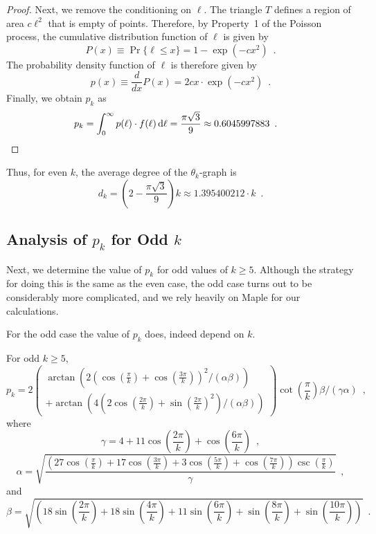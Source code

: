 \documentclass{patmorin}
\begin{document}
\begin{proof}
  Next, we remove the conditioning on $\ell$.  The triangle $T$ defines a
  region of area $c\ell^2$ that is empty of points.  Therefore,
  by Property~1 of the Poisson process, the cumulative distribution
  function of $\ell$ is given by
  \[
    P(x) \equiv \Pr\{\ell \le x\} = 1-\exp(-cx^2) \enspace .
  \]
  The probability density function of $\ell$ is therefore given by 
  \[
     p(x) \equiv \frac{d}{dx}P(x) =
     2cx\cdot\exp(-cx^2) \enspace .
  \]
  Finally, we obtain $p_k$ as 
  \begin{align*}
     p_k = \int_0^\infty p(\ell)\cdot f(\ell)\,\mathrm{d}\ell 
     = \frac{\pi\sqrt{3}}{9}
      \approx 0.6045997883  \enspace . & \qedhere
  \end{align*}
\end{proof}

Thus, for even $k$, the average degree of the $\theta_k$-graph is 
\[ d_k = \left(2-\frac{\pi\sqrt{3}}{9}\right)k \approx 1.395400212\cdot k \enspace . \]

\subsection{Analysis of $p_k$ for Odd $k$}

Next, we determine the value of $p_k$ for odd values of
$k\ge 5$.  Although the strategy for doing this is the same as the even
case, the odd case turns out to be considerably more complicated, and
we rely heavily on Maple for our calculations.

For the odd case the value of $p_k$ does, indeed depend on $k$.

\begin{lem}
  For odd $k\ge 5$,
\[
p_k = 
2
\left(\begin{array}{l}
  \arctan\left(
     2\left(\cos\left(\frac{\pi }{k}\right)
       +\cos\left(\frac{3 \pi }{k}\right)\right)^2 / (\alpha\beta) 
  \right) \\
   + \arctan\left(
       4 \left(2 \cos\left(\frac{2 \pi }{k}\right)
       +\sin\left(\frac{2 \pi }{k}\right)^2\right)/(\alpha\beta) 
     \right)
  \end{array}
\right)
\cot\left(\frac{\pi }{k}\right) 
\beta
/
\left(\gamma \alpha\right)\enspace ,
\]
where
\[
\gamma =4+11 \cos\left(\frac{2 \pi }{k}\right)+\cos\left(\frac{6 \pi }{k}\right) \enspace ,
\]
\[
\alpha = 
\sqrt{\frac{\left(27 \cos\left(\frac{\pi }{k}\right)+17 \cos\left(\frac{3 \pi }{k}\right)+3 \cos\left(\frac{5 \pi }{k}\right)+\cos\left(\frac{7 \pi }{k}\right)\right) \csc\left(\frac{\pi }{k}\right)}{\gamma}} \enspace ,
\]
and
\[
\beta = \sqrt{\left(18 \sin\left(\frac{2 \pi }{k}\right)+18 \sin\left(\frac{4 \pi }{k}\right)+11 \sin\left(\frac{6 \pi }{k}\right)+\sin\left(\frac{8 \pi }{k}\right)+\sin\left(\frac{10 \pi }{k}\right)\right)} \enspace .
\]
\end{lem}
\end{document}
